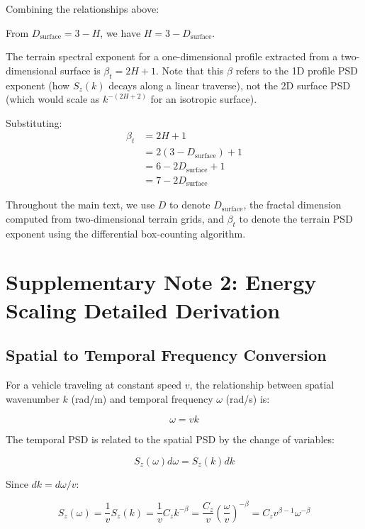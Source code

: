 \documentclass[11pt]{article}
\begin{document}
Combining the relationships above:

From $D_{\text{surface}} = 3 - H$, we have $H = 3 - D_{\text{surface}}$.

The terrain spectral exponent for a one-dimensional profile extracted from a two-dimensional surface is $\beta_t = 2H + 1$. Note that this $\beta$ refers to the 1D profile PSD exponent (how $S_z(k)$ decays along a linear traverse), not the 2D surface PSD (which would scale as $k^{-(2H+2)}$ for an isotropic surface).

Substituting:
\begin{align}
\beta_t &= 2H + 1 \\
&= 2(3 - D_{\text{surface}}) + 1 \\
&= 6 - 2D_{\text{surface}} + 1 \\
&= 7 - 2D_{\text{surface}}
\end{align}

Throughout the main text, we use $D$ to denote $D_{\text{surface}}$, the fractal dimension computed from two-dimensional terrain grids, and $\beta_t$ to denote the terrain PSD exponent using the differential box-counting algorithm.

\section{Supplementary Note 2: Energy Scaling Detailed Derivation}

\subsection{Spatial to Temporal Frequency Conversion}

For a vehicle traveling at constant speed $v$, the relationship between spatial wavenumber $k$ (rad/m) and temporal frequency $\omega$ (rad/s) is:

\begin{equation}
\omega = vk
\end{equation}

The temporal PSD is related to the spatial PSD by the change of variables:

\begin{equation}
S_z(\omega) d\omega = S_z(k) dk
\end{equation}

Since $dk = d\omega/v$:

\begin{equation}
S_z(\omega) = \frac{1}{v} S_z(k) = \frac{1}{v} C_z k^{-\beta} = \frac{C_z}{v} \left(\frac{\omega}{v}\right)^{-\beta} = C_z v^{\beta-1} \omega^{-\beta}
\end{equation}
\end{document}
